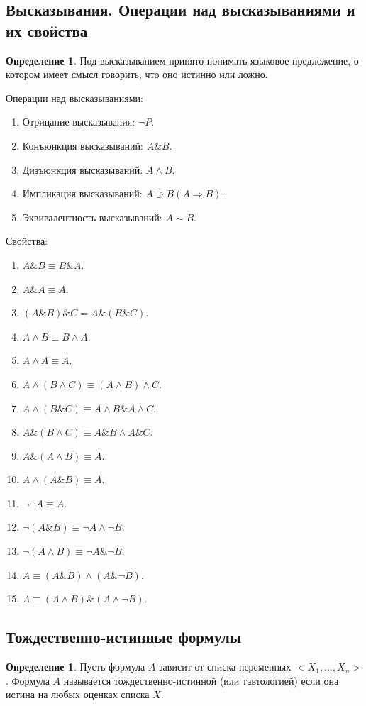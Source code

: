 \documentclass[12pt]{report}
\theoremstyle{definition}
\newtheorem{definition}[theorem]{Определение}
\begin{document}
\subsection{Высказывания. Операции над высказываниями и их свойства}

\begin{definition}
Под высказыванием принято понимать языковое предложение, о котором
имеет смысл говорить, что оно истинно или ложно.
\end{definition}

Операции над высказываниями:
\begin{enumerate}
\item Отрицание высказывания: $\neg P$.
\item Конъюнкция высказываний: $A \& B$.
\item Дизъюнкция высказываний: $A \wedge B$.
\item Импликация высказываний: $A \supset B (A \Rightarrow B).$
\item Эквивалентность высказываний: $A \sim B$.
\end{enumerate}

Свойства:
\begin{enumerate}
\item $A \& B \equiv B \& A$.
\item $A \& A \equiv A$.
\item $(A \& B) \& C = A \& (B \& C)$.
\item $A \wedge B \equiv B \wedge A$.
\item $A \wedge A \equiv A$.
\item $A \wedge (B \wedge C) \equiv (A \wedge B) \wedge C$.
\item $A \wedge (B \& C) \equiv A \wedge B \& A \wedge C$.
\item $A \& (B \wedge C) \equiv A \& B \wedge A \& C$.
\item $A \& (A \wedge B) \equiv A$.
\item $A \wedge (A \& B) \equiv A$.
\item $\neg \neg A \equiv A$.
\item $\neg(A \& B) \equiv \neg A \wedge \neg B$.
\item $\neg(A \wedge B) \equiv \neg A \& \neg B$.
\item $A \equiv (A \& B) \wedge (A \& \neg B)$.
\item $A \equiv (A \wedge B) \& (A \wedge \neg B)$.
\end{enumerate}

\subsection{Тождественно-истинные формулы}
\begin{definition}
Пусть формула $A$ зависит от списка переменных $<X_1, \dots, X_n>$.
Формула $A$ называется тождественно-истинной (или тавтологией) если она истина
на любых оценках списка $X$.
\end{definition}
\end{document}
